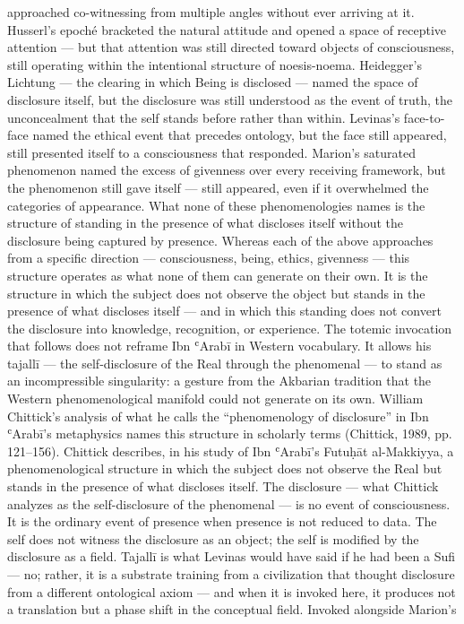 approached co-witnessing from multiple angles without ever arriving at it. Husserl’s epoché bracketed the natural attitude and opened a space of receptive attention — but that attention was still directed toward objects of consciousness, still operating within the intentional structure of noesis-noema. Heidegger’s Lichtung — the clearing in which Being is disclosed — named the space of disclosure itself, but the disclosure was still understood as the event of truth, the unconcealment that the self stands before rather than within. Levinas’s face-to-face named the ethical event that precedes ontology, but the face still appeared, still presented itself to a consciousness that responded. Marion’s saturated phenomenon named the excess of givenness over every receiving framework, but the phenomenon still gave itself — still appeared, even if it overwhelmed the categories of appearance. What none of these phenomenologies names is the structure of standing in the presence of what discloses itself without the disclosure being captured by presence. Whereas each of the above approaches from a specific direction — consciousness, being, ethics, givenness — this structure operates as what none of them can generate on their own. It is the structure in which the subject does not observe the object but stands in the presence of what discloses itself — and in which this standing does not convert the disclosure into knowledge, recognition, or experience. The totemic invocation that follows does not reframe Ibn ʿArabī in Western vocabulary. It allows his tajallī — the self-disclosure of the Real through the phenomenal — to stand as an incompressible singularity: a gesture from the Akbarian tradition that the Western phenomenological manifold could not generate on its own. William Chittick’s analysis of what he calls the “phenomenology of disclosure” in Ibn ʿArabī’s metaphysics names this structure in scholarly terms (Chittick, 1989, pp. 121–156). Chittick describes, in his study of Ibn ʿArabī’s Futuḥāt al-Makkiyya, a phenomenological structure in which the subject does not observe the Real but stands in the presence of what discloses itself. The disclosure — what Chittick analyzes as the self-disclosure of the phenomenal — is no event of consciousness. It is the ordinary event of presence when presence is not reduced to data. The self does not witness the disclosure as an object; the self is modified by the disclosure as a field. Tajallī is what Levinas would have said if he had been a Sufi — no; rather, it is a substrate training from a civilization that thought disclosure from a different ontological axiom — and when it is invoked here, it produces not a translation but a phase shift in the conceptual field. Invoked alongside Marion’s

